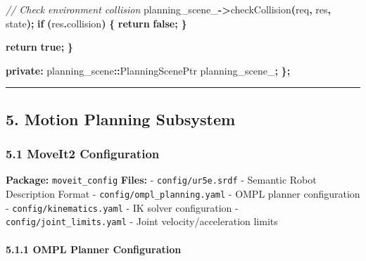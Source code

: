 \documentclass[
]{article}
\newenvironment{Shaded}{\begin{snugshade}}{\end{snugshade}}
\newcommand{\CommentTok}[1]{\textcolor[rgb]{0.56,0.35,0.01}{\textit{#1}}}
\newcommand{\ControlFlowTok}[1]{\textcolor[rgb]{0.13,0.29,0.53}{\textbf{#1}}}
\newcommand{\KeywordTok}[1]{\textcolor[rgb]{0.13,0.29,0.53}{\textbf{#1}}}
\newcommand{\NormalTok}[1]{#1}
\newcommand{\OperatorTok}[1]{\textcolor[rgb]{0.81,0.36,0.00}{\textbf{#1}}}
\newcommand{\VariableTok}[1]{\textcolor[rgb]{0.00,0.00,0.00}{#1}}
\begin{document}
\begin{Shaded}
\begin{Highlighting}[]
        \CommentTok{// Check environment collision}
        \VariableTok{planning\_scene\_}\OperatorTok{{-}\textgreater{}}\NormalTok{checkCollision}\OperatorTok{(}\NormalTok{req}\OperatorTok{,}\NormalTok{ res}\OperatorTok{,}\NormalTok{ state}\OperatorTok{);}
        \ControlFlowTok{if} \OperatorTok{(}\NormalTok{res}\OperatorTok{.}\NormalTok{collision}\OperatorTok{)} \OperatorTok{\{}
            \ControlFlowTok{return} \KeywordTok{false}\OperatorTok{;}
        \OperatorTok{\}}

        \ControlFlowTok{return} \KeywordTok{true}\OperatorTok{;}
    \OperatorTok{\}}

\KeywordTok{private}\OperatorTok{:}
\NormalTok{    planning\_scene}\OperatorTok{::}\NormalTok{PlanningScenePtr }\VariableTok{planning\_scene\_}\OperatorTok{;}
\OperatorTok{\};}
\end{Highlighting}
\end{Shaded}

\begin{center}\rule{0.5\linewidth}{0.5pt}\end{center}

\hypertarget{motion-planning-subsystem}{%
\subsection{5. Motion Planning
Subsystem}\label{motion-planning-subsystem}}

\hypertarget{moveit2-configuration}{%
\subsubsection{5.1 MoveIt2 Configuration}\label{moveit2-configuration}}

\textbf{Package:} \texttt{moveit\_config} \textbf{Files:} -
\texttt{config/ur5e.srdf} - Semantic Robot Description Format -
\texttt{config/ompl\_planning.yaml} - OMPL planner configuration -
\texttt{config/kinematics.yaml} - IK solver configuration -
\texttt{config/joint\_limits.yaml} - Joint velocity/acceleration limits

\hypertarget{ompl-planner-configuration}{%
\paragraph{5.1.1 OMPL Planner
Configuration}\label{ompl-planner-configuration}}
\end{document}
